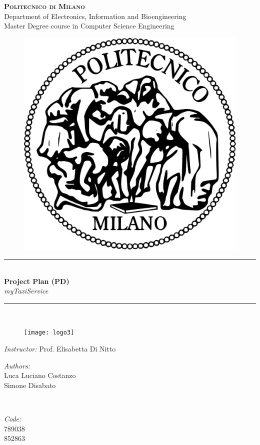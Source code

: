 \documentclass[12pt]{report}
\begin{document}
\pagestyle{empty}

\cleardoublepage


\begin{titlepage}

\newcommand{\HRule}{\rule{\linewidth}{0.5mm}} %

\center %

\textsc{\huge \bf{Politecnico di Milano}}\\[0.5cm]
\textsf{\Large Department of Electronics, Information and Bioengineering}\\[0.25cm] %
\textsf{\large Master Degree course in Computer Science Engineering}\\[0.5cm] %

\begin{figure}[h]
	\centering
	\includegraphics[width = 3 cm]{Figures/PoliMi}
\end{figure}


\HRule \\

\LARGE \textbf {Project Plan (PD)} \\[0.2cm]
\large \textit {myTaxiService}
\\ %
\HRule \\

\begin{figure}[h]
	\center
	\texttt{[image: logo3]}
\end{figure}

\begin{flushleft}
	\large \textit{Instructor:} Prof. Elisabetta Di Nitto \\[0.5cm]

	\begin{minipage}{0.45\textwidth}
	\begin{flushleft} \large
	\emph{Authors:}\\
	Luca Luciano Costanzo\\
	Simone Disabato
	\end{flushleft}
	\end{minipage}
	~
	\begin{minipage}{0.45\textwidth}
	\begin{flushright} \large
	\emph{Code:} \\
	789038\\
	852863
	\end{flushright}
	\end{minipage} \\[1cm]


\end{flushleft}
\end{titlepage}
\end{document}
